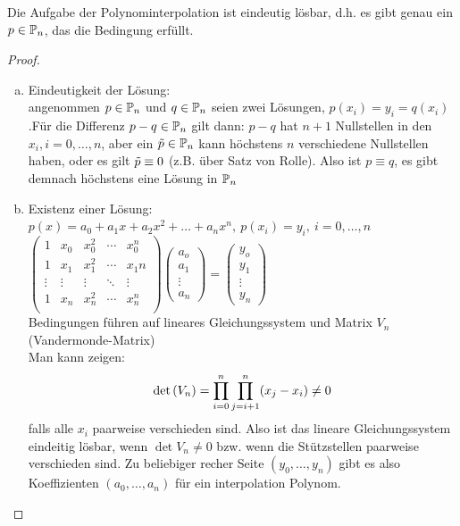 \documentclass[../Skript.tex]{subfiles}
\begin{document}
\begin{theorem}
    Die Aufgabe der Polynominterpolation ist eindeutig lösbar, d.h. es gibt genau ein $p\in\mathbb{P}_n$,
    das die Bedingung erfüllt.    
\end{theorem}
\begin{proof}\hfill\\
\begin{enumerate}[(a)]
    \item Eindeutigkeit der Lösung:\\ angenommen $p\in\mathbb{P}_n$ und $q\in\mathbb{P}_n$ seien zwei Lösungen, $p(x_i)=y_i = 
    q(x_i)$.\newline Für die Differenz $p-q\in\mathbb{P}_n$ gilt dann: \newline
    $p-q$ hat $n+1$ Nullstellen in den $x_i, i=0,\dots, n$, aber ein $\Tilde{p}\in \mathbb{P}_n$ kann höchstens $n$ verschiedene 
    Nullstellen haben, oder es gilt $\Tilde{p}\equiv 0$ (z.B. über Satz von Rolle). Also ist $p\equiv q$, es gibt demnach 
    höchstens eine Lösung in $\mathbb{P}_n$ 

    \item Existenz einer Lösung:\\
    $p(x)= a_0+a_1x+a_2x^2+\dots+a_nx^n,\ p(x_i)=y_i, \ i=0,\dots,n$\\
    $\begin{pmatrix}
    1 & x_0 & x_0^2 & \cdots & x_0^n \\
    1 & x_1 & x_1^2 & \cdots & x_1n \\
    \vdots & \vdots & \vdots & \ddots & \vdots \\
    1 & x_n & x_n^2 & \cdots & x_n^n \\
    \end{pmatrix}
    \begin{pmatrix}
        a_o \\
        a_1 \\
        \vdots \\
        a_n
    \end{pmatrix} 
    =
    \begin{pmatrix}
        y_o \\
        y_1 \\
        \vdots \\
        y_n
    \end{pmatrix}$\\
    Bedingungen führen auf lineares Gleichungssystem und Matrix $V_n$ (Vandermonde-Matrix)\\
    Man kann zeigen: $$\det{V_n}=\dprod^n_{i=0}\dprod^n_{j=i+1} (x_j-x_i) \neq 0 $$falls alle $x_i$ paarweise verschieden 
    sind. Also ist das lineare Gleichungssystem eindeitig lösbar, wenn $\det{V_n}\neq 0$ bzw. wenn die Stützstellen paarweise verschieden sind. Zu beliebiger recher Seite 
    $(y_0,\dots,y_n)$ gibt es also Koeffizienten $(a_0,\dots,a_n)$ für ein interpolation Polynom.\\
\end{enumerate}
\end{proof}
\end{document}
